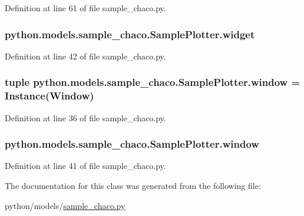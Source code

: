 Definition at line 61 of file sample\-\_\-chaco.\-py.

\hypertarget{classpython_1_1models_1_1sample__chaco_1_1_sample_plotter_afedec87c239dc760c31d3736dab93e2a}{
\subsubsection[{widget}]{\setlength{\rightskip}{0pt plus 5cm}python.\-models.\-sample\-\_\-chaco.\-Sample\-Plotter.\-widget}}\label{classpython_1_1models_1_1sample__chaco_1_1_sample_plotter_afedec87c239dc760c31d3736dab93e2a}


Definition at line 42 of file sample\-\_\-chaco.\-py.

\hypertarget{classpython_1_1models_1_1sample__chaco_1_1_sample_plotter_ae6c114f5e8dfbfaa739ee811c4598678}{
\subsubsection[{window}]{\setlength{\rightskip}{0pt plus 5cm}tuple python.\-models.\-sample\-\_\-chaco.\-Sample\-Plotter.\-window = Instance(Window)\hspace{0.3cm}{\ttfamily [static]}}}\label{classpython_1_1models_1_1sample__chaco_1_1_sample_plotter_ae6c114f5e8dfbfaa739ee811c4598678}


Definition at line 36 of file sample\-\_\-chaco.\-py.

\hypertarget{classpython_1_1models_1_1sample__chaco_1_1_sample_plotter_a971830a543a8257c70d6fd0aeb4a7899}{
\subsubsection[{window}]{\setlength{\rightskip}{0pt plus 5cm}python.\-models.\-sample\-\_\-chaco.\-Sample\-Plotter.\-window}}\label{classpython_1_1models_1_1sample__chaco_1_1_sample_plotter_a971830a543a8257c70d6fd0aeb4a7899}


Definition at line 41 of file sample\-\_\-chaco.\-py.



The documentation for this class was generated from the following file\-:\begin{DoxyCompactItemize}
\item 
python/models/\hyperlink{sample__chaco_8py}{sample\-\_\-chaco.\-py}\end{DoxyCompactItemize}
